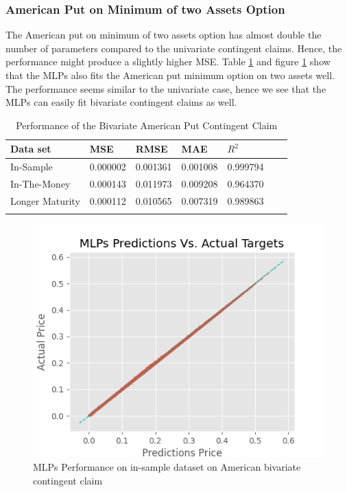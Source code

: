 \subsubsection{American Put on Minimum of two Assets Option}
The American put on minimum of two assets option has almost double the number of parameters compared to the univariate contingent claims. Hence, the performance might produce a slightly higher MSE. Table \ref{tab:AmerMinPerformanceComparision} and figure \ref{fig:MLPsInSampleAmerMin} show that the MLPs also fits the American put minimum option on two assets well. The performance seems similar to the univariate case, hence we see that the MLPs can easily fit bivariate contingent claims as well. \\ 

\begin{table}[th]
\caption{Performance of the Bivariate American Put Contingent Claim}
\label{tab:AmerMinPerformanceComparision}
\centering
\begin{tabular}{l l l l l l l }
\toprule
\textbf{Data set} & \textbf{MSE} & \textbf{RMSE} & \textbf{MAE} & \textbf{$R^2$} \\
\midrule
In-Sample & 0.000002 & 0.001361 & 0.001008 & 0.999794\\
In-The-Money & 0.000143 & 0.011973 & 0.009208 & 0.964370\\
Longer Maturity & 0.000112 & 0.010565 & 0.007319 & 0.989863\\
\bottomrule\\
\end{tabular}
\end{table}

\begin{figure}[H]
\centering
\includegraphics{Figures/inSampleAmerMinP.png}
\decoRule
\caption[MLPs Performance for In-sample Dataset American Put on minimum on two Assets]{MLPs Performance on in-sample dataset on American bivariate contingent claim}
\label{fig:MLPsInSampleAmerMin}
\end{figure}

